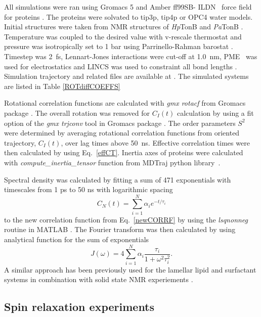 \documentclass[pre,aps,floatfix,authordate1-4,twocolumn]{revtex4-1}
\begin{document}
All simulations were ran using Gromacs 5 \cite{abraham15}
and Amber ff99SB- ILDN~\cite{lindorff10} force field for proteins . The proteins were solvated
to tip3p\cite{jorgensen83}, tip4p \cite{jorgensen83} or OPC4 \cite{izadi14} water models.
Initial structures were taken from NMR structures of {\it Hp}TonB \cite{ciragan16} and
{\it Pa}TonB \cite{??}.
Temperature was coupled to the desired value with v-rescale thermostat \cite{bussi07} and pressure was 
isotropically set to 1 bar using Parrinello-Rahman barostat \cite{parrinello81}.
Timestep was 2~fs, Lennart-Jones interactions were cut-off at 1.0~nm,
PME~\cite{darden93,essman95} was used for electrostatics and LINCS was used
to constraint all bond lengths \cite{hess07}. Simulation trajectory and related
files are available at \cite{??}. The simulated systems are listed
in Table \ref{ROTdiffCOEFFS}


Rotational correlation functions are calculated with {\it gmx rotacf} from
Gromacs package \cite{gromacsMANUAL}. The overall rotation was removed
for $C_I(t)$ calculation by using a fit option of the {\it gmx trjconv} tool
in Gromacs package \cite{gromacsMANUAL}. The order parameters $S^2$
were determined by averaging rotational correlation functions from
oriented trajectory, $C_I(t)$, over lag times above 50~ns. Effective correlation times were then
calculated by using Eq.~\ref{effCT}. 
Inertia axes of proteins were calculated with {\it compute\_inertia\_tensor}
function from MDTraj python library~\cite{McGibbon2015MDTraj}.

Spectral density was calculated by fitting a
sum of 471 exponentials with timescales from 1 ps to 50 ns
with logarithmic spacing
\begin{equation}\label{gprime_fit}
C_N(t)=\sum_{i=1}^{N}\alpha_i e^{-t/\tau_i}
\end{equation}
to the new correlation function from Eq.~\ref{newCORRF}
by using the {\it lsqnonneg} routine in MATLAB \cite{matlab}.
The Fourier transform was then calculated by using analytical function
for the sum of exponentials 
\begin{equation}\label{FTanal}
J(\omega) =  4 \sum_{i=1}^{N}\alpha_i\frac{\tau_i}{1+\omega^2\tau_i^2}.
\end{equation}
A similar approach has been previously used for the lamellar lipid and surfactant
systems in combination with solid state NMR experiements \cite{nowacka13,ferreira15}.


\subsection{Spin relaxation experiments}
\end{document}
